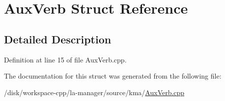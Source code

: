 \hypertarget{structAuxVerb}{
\section{AuxVerb Struct Reference}
\label{structAuxVerb}
}


\subsection{Detailed Description}


Definition at line 15 of file AuxVerb.cpp.

The documentation for this struct was generated from the following file:\begin{CompactItemize}
\item 
/disk/workspace-cpp/la-manager/source/kma/\hyperlink{AuxVerb_8cpp}{AuxVerb.cpp}\end{CompactItemize}
